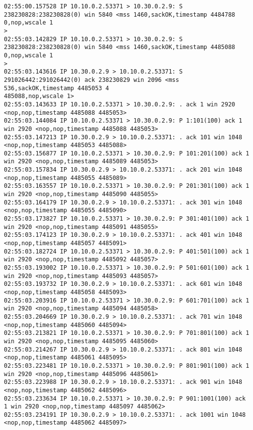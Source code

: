 \documentclass[a4paper,12pt]{article}
\begin{document}
\begin{Verbatim}
02:55:00.157528 IP 10.10.0.2.53371 > 10.30.0.2.9: S 238230828:238230828(0) win 5840 <mss 1460,sackOK,timestamp 4484788 0,nop,wscale 1
>
02:55:03.142829 IP 10.10.0.2.53371 > 10.30.0.2.9: S 238230828:238230828(0) win 5840 <mss 1460,sackOK,timestamp 4485088 0,nop,wscale 1
>
02:55:03.143616 IP 10.30.0.2.9 > 10.10.0.2.53371: S 291026442:291026442(0) ack 238230829 win 2096 <mss 536,sackOK,timestamp 4485053 4
485088,nop,wscale 1>
02:55:03.143633 IP 10.10.0.2.53371 > 10.30.0.2.9: . ack 1 win 2920 <nop,nop,timestamp 4485088 4485053>
02:55:03.144084 IP 10.10.0.2.53371 > 10.30.0.2.9: P 1:101(100) ack 1 win 2920 <nop,nop,timestamp 4485088 4485053>
02:55:03.147213 IP 10.30.0.2.9 > 10.10.0.2.53371: . ack 101 win 1048 <nop,nop,timestamp 4485053 4485088>
02:55:03.156877 IP 10.10.0.2.53371 > 10.30.0.2.9: P 101:201(100) ack 1 win 2920 <nop,nop,timestamp 4485089 4485053>
02:55:03.157834 IP 10.30.0.2.9 > 10.10.0.2.53371: . ack 201 win 1048 <nop,nop,timestamp 4485055 4485089>
02:55:03.163557 IP 10.10.0.2.53371 > 10.30.0.2.9: P 201:301(100) ack 1 win 2920 <nop,nop,timestamp 4485090 4485055>
02:55:03.164179 IP 10.30.0.2.9 > 10.10.0.2.53371: . ack 301 win 1048 <nop,nop,timestamp 4485055 4485090>
02:55:03.173827 IP 10.10.0.2.53371 > 10.30.0.2.9: P 301:401(100) ack 1 win 2920 <nop,nop,timestamp 4485091 4485055>
02:55:03.174123 IP 10.30.0.2.9 > 10.10.0.2.53371: . ack 401 win 1048 <nop,nop,timestamp 4485057 4485091>
02:55:03.182724 IP 10.10.0.2.53371 > 10.30.0.2.9: P 401:501(100) ack 1 win 2920 <nop,nop,timestamp 4485092 4485057>
02:55:03.193002 IP 10.10.0.2.53371 > 10.30.0.2.9: P 501:601(100) ack 1 win 2920 <nop,nop,timestamp 4485093 4485057>
02:55:03.193732 IP 10.30.0.2.9 > 10.10.0.2.53371: . ack 601 win 1048 <nop,nop,timestamp 4485058 4485093>
02:55:03.203916 IP 10.10.0.2.53371 > 10.30.0.2.9: P 601:701(100) ack 1 win 2920 <nop,nop,timestamp 4485094 4485058>
02:55:03.204669 IP 10.30.0.2.9 > 10.10.0.2.53371: . ack 701 win 1048 <nop,nop,timestamp 4485060 4485094>
02:55:03.213821 IP 10.10.0.2.53371 > 10.30.0.2.9: P 701:801(100) ack 1 win 2920 <nop,nop,timestamp 4485095 4485060>
02:55:03.214267 IP 10.30.0.2.9 > 10.10.0.2.53371: . ack 801 win 1048 <nop,nop,timestamp 4485061 4485095>
02:55:03.223481 IP 10.10.0.2.53371 > 10.30.0.2.9: P 801:901(100) ack 1 win 2920 <nop,nop,timestamp 4485096 4485061>
02:55:03.223988 IP 10.30.0.2.9 > 10.10.0.2.53371: . ack 901 win 1048 <nop,nop,timestamp 4485062 4485096>
02:55:03.233634 IP 10.10.0.2.53371 > 10.30.0.2.9: P 901:1001(100) ack 1 win 2920 <nop,nop,timestamp 4485097 4485062>
02:55:03.234191 IP 10.30.0.2.9 > 10.10.0.2.53371: . ack 1001 win 1048 <nop,nop,timestamp 4485062 4485097>

\end{Verbatim}
\end{document}
